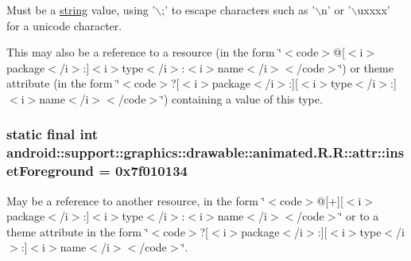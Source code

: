 Must be a \hyperlink{classandroid_1_1support_1_1graphics_1_1drawable_1_1animated_1_1_r_1_1string}{string} value, using '$\backslash$;' to escape characters such as '$\backslash$n' or '$\backslash$uxxxx' for a unicode character. 

This may also be a reference to a resource (in the form \char`\"{}$<$code$>$@\mbox{[}$<$i$>$package$<$/i$>$:\mbox{]}$<$i$>$type$<$/i$>$:$<$i$>$name$<$/i$>$$<$/code$>$\char`\"{}) or theme attribute (in the form \char`\"{}$<$code$>$?\mbox{[}$<$i$>$package$<$/i$>$:\mbox{]}\mbox{[}$<$i$>$type$<$/i$>$:\mbox{]}$<$i$>$name$<$/i$>$$<$/code$>$\char`\"{}) containing a value of this type. \hypertarget{classandroid_1_1support_1_1graphics_1_1drawable_1_1animated_1_1_r_1_1attr_8c96ab28909007663d1695bf3dea5a8a}{
\subsubsection[{insetForeground}]{\setlength{\rightskip}{0pt plus 5cm}static final int android::support::graphics::drawable::animated.R.R::attr::insetForeground = 0x7f010134}}
\label{classandroid_1_1support_1_1graphics_1_1drawable_1_1animated_1_1_r_1_1attr_8c96ab28909007663d1695bf3dea5a8a}


May be a reference to another resource, in the form \char`\"{}$<$code$>$@\mbox{[}+\mbox{]}\mbox{[}$<$i$>$package$<$/i$>$:\mbox{]}$<$i$>$type$<$/i$>$:$<$i$>$name$<$/i$>$$<$/code$>$\char`\"{} or to a theme attribute in the form \char`\"{}$<$code$>$?\mbox{[}$<$i$>$package$<$/i$>$:\mbox{]}\mbox{[}$<$i$>$type$<$/i$>$:\mbox{]}$<$i$>$name$<$/i$>$$<$/code$>$\char`\"{}. 

